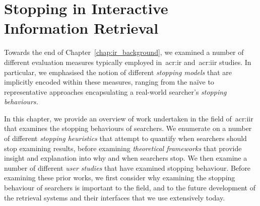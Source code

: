 
\chapter[A Background of Stopping in IIR]{Stopping in Interactive\\Information Retrieval}\label{chap:stopping_background}
Towards the end of Chapter~\ref{chap:ir_background}, we examined a number of different evaluation measures typically employed in~\gls{acr:ir} and~\gls{acr:iir} studies. In particular, we emphasised the notion of different \emph{stopping models} that are implicitly encoded within these measures, ranging from the na\"{i}ve to representative approaches encapsulating a real-world searcher's \emph{stopping behaviours.}

\begin{figure}[h]
    \centering
    \vspace{4mm}
    \label{fig:stopsign}
    \vspace{-5mm}
\end{figure}

In this chapter, we provide an overview of work undertaken in the field of~\gls{acr:iir} that examines the stopping behaviours of searchers. We enumerate on a number of different \emph{stopping heuristics} that attempt to quantify when searchers should stop examining results, before examining \emph{theoretical frameworks} that provide insight and explanation into why and when searchers stop. We then examine a number of different \emph{user studies} that have examined stopping behaviour. Before examining these prior works, we first consider why examining the stopping behaviour of searchers is important to the field, and to the future development of the retrieval systems and their interfaces that we use extensively today.

